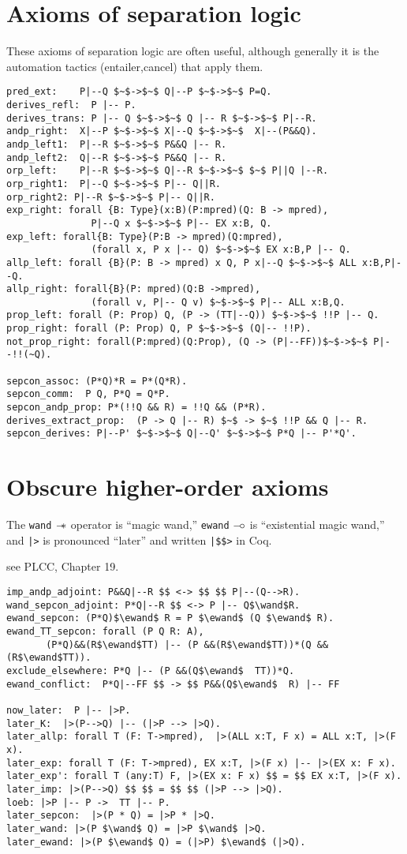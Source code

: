 \documentclass[12pt,fleqn,openany,oneside,showtrims]{memoir}
\newcommand{\ychapter}[2]{\chapter[#1]{#1}}
\begin{document}
\ychapter{Axioms of separation logic}{(see PLCC \autoref{ch:logic})}
These axioms of separation logic are often useful,
although generally it is the automation tactics
(\textsf{entailer,cancel}) that apply them.

\begin{lstlisting}
pred_ext:    P|--Q $~$->$~$ Q|--P $~$->$~$ P=Q.
derives_refl:  P |-- P.
derives_trans: P |-- Q $~$->$~$ Q |-- R $~$->$~$ P|--R.
andp_right:  X|--P $~$->$~$ X|--Q $~$->$~$  X|--(P&&Q).
andp_left1:  P|--R $~$->$~$ P&&Q |-- R.
andp_left2:  Q|--R $~$->$~$ P&&Q |-- R.
orp_left:    P|--R $~$->$~$ Q|--R $~$->$~$ $~$ P||Q |--R.
orp_right1:  P|--Q $~$->$~$ P|-- Q||R.
orp_right2: P|--R $~$->$~$ P|-- Q||R.
exp_right: forall {B: Type}(x:B)(P:mpred)(Q: B -> mpred),
               P|--Q x $~$->$~$ P|-- EX x:B, Q.
exp_left: forall{B: Type}(P:B -> mpred)(Q:mpred),
               (forall x, P x |-- Q) $~$->$~$ EX x:B,P |-- Q.
allp_left: forall {B}(P: B -> mpred) x Q, P x|--Q $~$->$~$ ALL x:B,P|--Q.
allp_right: forall{B}(P: mpred)(Q:B ->mpred),
               (forall v, P|-- Q v) $~$->$~$ P|-- ALL x:B,Q.
prop_left: forall (P: Prop) Q, (P -> (TT|--Q)) $~$->$~$ !!P |-- Q.
prop_right: forall (P: Prop) Q, P $~$->$~$ (Q|-- !!P).
not_prop_right: forall(P:mpred)(Q:Prop), (Q -> (P|--FF))$~$->$~$ P|--!!(~Q).

sepcon_assoc: (P*Q)*R = P*(Q*R).
sepcon_comm:  P Q, P*Q = Q*P.
sepcon_andp_prop: P*(!!Q && R) = !!Q && (P*R).
derives_extract_prop:  (P -> Q |-- R) $~$ -> $~$ !!P && Q |-- R.
sepcon_derives: P|--P' $~$->$~$ Q|--Q' $~$->$~$ P*Q |-- P'*Q'.
\end{lstlisting}

\chapter{Obscure higher-order axioms}

The \lstinline{wand} $\mathrel{-\hspace{-.7ex}*}$ operator is ``magic wand,''
\lstinline{ewand} $\mathrel{-\hspace{-.42ex}\circ}$ is ``existential magic wand,''
and \lstinline{|>} is pronounced ``later''
and written \lstinline{|$$>} in Coq.

see PLCC, Chapter 19.

\begin{lstlisting}
imp_andp_adjoint: P&&Q|--R $$ <-> $$ $$ P|--(Q-->R).
wand_sepcon_adjoint: P*Q|--R $$ <-> P |-- Q$\wand$R.
ewand_sepcon: (P*Q)$\ewand$ R = P $\ewand$ (Q $\ewand$ R).
ewand_TT_sepcon: forall (P Q R: A),
       (P*Q)&&(R$\ewand$TT) |-- (P &&(R$\ewand$TT))*(Q && (R$\ewand$TT)).
exclude_elsewhere: P*Q |-- (P &&(Q$\ewand$  TT))*Q.
ewand_conflict:  P*Q|--FF $$ -> $$ P&&(Q$\ewand$  R) |-- FF

now_later:  P |-- |>P.
later_K:  |>(P-->Q) |-- (|>P --> |>Q).
later_allp: forall T (F: T->mpred),  |>(ALL x:T, F x) = ALL x:T, |>(F x).
later_exp: forall T (F: T->mpred), EX x:T, |>(F x) |-- |>(EX x: F x).
later_exp': forall T (any:T) F, |>(EX x: F x) $$ = $$ EX x:T, |>(F x).
later_imp: |>(P-->Q) $$ $$ = $$ $$ (|>P --> |>Q).
loeb: |>P |-- P ->  TT |-- P.
later_sepcon:  |>(P * Q) = |>P * |>Q.
later_wand: |>(P $\wand$ Q) = |>P $\wand$ |>Q.
later_ewand: |>(P $\ewand$ Q) = (|>P) $\ewand$ (|>Q).
\end{lstlisting}
\end{document}
